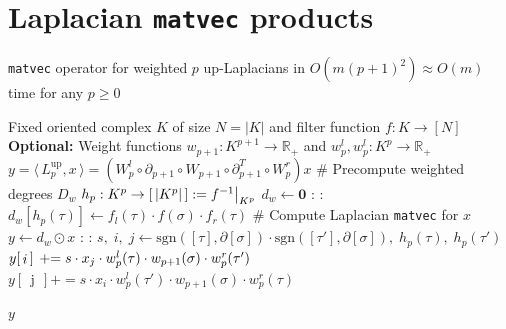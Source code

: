\documentclass[12pt]{article}
\numberwithin{equation}{section}
\newcommand{\+}{%
	\raisebox{0.18ex}{\scaleobj{0.55}{+}}
}
\newcommand\restr[2]{{%
  \left.\kern-\nulldelimiterspace %
  #1 %
  \vphantom{\big|} %
  \right|_{#2} %
  }}
\theoremstyle{definition}
\begin{document}
\newlength\myindent 
\setlength\myindent{6em} 
\newcommand\bindent{
  \begingroup 
  \setlength{\itemindent}{\myindent} 
  \addtolength{\algorithmicindent}{\myindent} 
}
\newcommand\eindent{\endgroup} %

\section{Laplacian \texttt{matvec} products}\label{sec:up_laplace_matvec}
\begin{algorithm}
\caption{\texttt{matvec} operator for weighted $p$ up-Laplacians in $O(m(p+1)^2) \approx O(m)$ time for any $p \geq 0$}	
\begin{algorithmic}
\Require Fixed oriented complex $K$ of size $N=\lvert K \rvert$ and filter function $f: K \to [N]$ \\
\hspace{-1.38em} \textbf{Optional:} Weight functions $w_{p+1}: K^{p+1} \to \mathbb{R}_{+}$ and  $w_{p}^l, w_{p}^l: K^p \to \mathbb{R}_{+}$
\Ensure $y = \langle \, L_p^{\mathrm{up}}, x \, \rangle = (W_p^{l} \circ \partial_{p+1} \circ W_{p+1} \circ \partial_{p+1}^T \circ W_p^{r}) x$
\vspace{0.25em}
\State \# Precompute weighted degrees $D_w$ 
\State $h_p : K^p \to [ \, \lvert K^p \rvert \, ] := \restr{f^{-1}}{K^p}$
\State $d_w \gets \mathbf{0}$
: 
	\For{$\tau \in \partial[\sigma]$}:
   	 	\State $d_w[h_p(\tau)] \gets f_l(\tau) \cdot f(\sigma) \cdot  f_r(\tau)$
   	\EndFor
\EndFor
\State 
\State \# Compute Laplacian \texttt{matvec} for $x$ 
\State $y \gets d_w \odot x$ \; 
:
    : 
    		\State $s, \; i, \; j \gets \mathrm{sgn}([\tau], \partial[\sigma]) \cdot \mathrm{sgn}([\tau'], \partial[\sigma]), \; h_p(\tau), \; h_p(\tau')$
    		\State $y[\,\mathop{i}\,] \hspace{0.1325em} \mathrel{{+}{=}} s \cdot x_{j} \cdot w_p^l(\tau) \cdot w_{p+1}(\sigma) \cdot w_p^r(\tau')$
    		\State $y[\,\mathop{j}\,] \mathrel{{+}{=}} s \cdot x_{i} \cdot w_p^l(\tau') \cdot w_{p+1}(\sigma) \cdot w_p^r(\tau)$ 
    \EndFor 
\EndFor

\Return $y$
\EndFunction
\end{algorithmic}
\end{algorithm}
\end{document}
